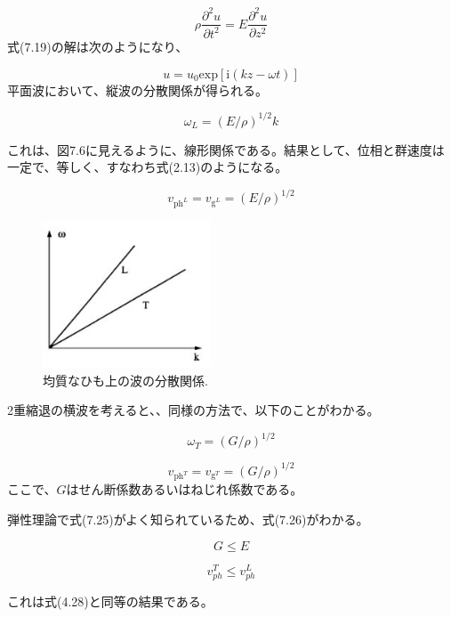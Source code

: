 \documentclass[11pt,a4j,uplatex]{jsarticle}
\begin{document}
\begin{equation}
  \rho\frac{\partial^2u}{\partial t^2}=E\frac{\partial^2u}{\partial z^2}\tag{7.19}
\end{equation}
式(7.19)の解は次のようになり、

\begin{equation}
  u=u_0\mathrm{exp}[\mathrm{i}(kz-\omega t)]\tag{7.20}
\end{equation}
平面波において、縦波の分散関係が得られる。

\begin{equation}
  \omega_L=(E/\rho)^{1/2}k\tag{7.21}
\end{equation}

これは、図7.6に見えるように、線形関係である。結果として、位相と群速度は一定で、等しく、すなわち式(2.13)のようになる。

\begin{equation}
  v_{\mathrm{ph}^L}=v_{\mathrm{g}^L}=(E/\rho)^{1/2}\tag{7.22}
\end{equation}

\begin{figure}[tb]
 \centering
 \includegraphics[clip,width=5cm]{7_6.JPG}
 \caption{均質なひも上の波の分散関係.}
 \label{7.6}
\end{figure}

2重縮退の横波を考えると、、同様の方法で、以下のことがわかる。

\begin{equation}
  \omega_T=(G/\rho)^{1/2}\tag{7.23}
\end{equation}

\begin{equation}
  v_{\mathrm{ph}^T}=v_{\mathrm{g}^T}=(G/\rho)^{1/2}\tag{7.24}
\end{equation}
ここで、$G$はせん断係数あるいはねじれ係数である。

弾性理論で式(7.25)がよく知られているため、式(7.26)がわかる。

\begin{equation}
  G\leq E\tag{7.25}
\end{equation}

\begin{equation}
  v_{ph}^T\leq v_{ph}^L\tag{7.26}
\end{equation}

これは式(4.28)と同等の結果である。
\end{document}
